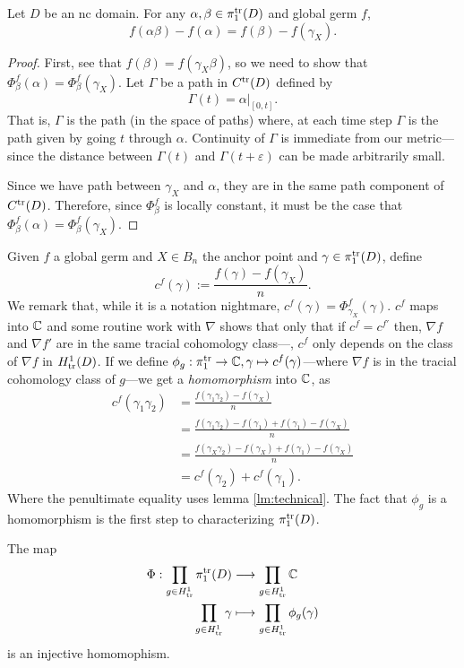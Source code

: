 \begin{lemma}%
\label{lm:technical}
  Let \(D\) be an nc domain. For any \(\alpha,\beta \in \pi_1^{\operatorname{tr}}(D)\) and
  global germ \(f\),
  \[
    f(\alpha\beta) - f(\alpha) = f(\beta) - f(\gamma_X).
  \]
\end{lemma}

\begin{proof}
  First, see that \(f(\beta)=f(\gamma_X\beta)\), so we need to show that
  \(\Phi_\beta^f(\alpha) = \Phi_\beta^f(\gamma_X)\). Let \(\Gamma\) be a path in
  \(C^{\operatorname{tr}}(D)\) defined by
  \[
    \Gamma(t) = \alpha\Big|_{[0,t]}.
  \]
  That is, \(\Gamma\) is the path (in the space of paths) where, at each time
  step \(\Gamma\) is the path given by going \(t\) through \(\alpha\).
  Continuity of \(\Gamma\) is immediate from our metric---since the distance
  between \(\Gamma(t)\) and \(\Gamma(t+\varepsilon)\) can be made arbitrarily
  small.

  Since we have path between \(\gamma_X\) and \(\alpha\), they are in the same
  path component of \(C^{\operatorname{tr}}(D)\). Therefore, since \(\Phi_\beta^f\) is locally
  constant, it must be the case that \(\Phi_\beta^f(\alpha) = \Phi_\beta^f(\gamma_X)\).
\end{proof}

Given \(f\) a global germ and \(X \in B_n\) the anchor point and
\(\gamma \in \pi_1^{\operatorname{tr}}(D)\), define
\[
  c^f(\gamma) := \frac{f(\gamma)-f(\gamma_X)}{n}.
\]
We remark that, while it is a notation nightmare,
\(c^f(\gamma) = \Phi^f_{\gamma_X}(\gamma)\). \(c^f\) maps into \(\mathbb{C} \) and some
routine work with \(\nabla\) shows that only that if \(c^f=c^{f'}\) then,
\(\nabla f\) and \(\nabla f'\) are in the same tracial
cohomology class---\ie, \(c^f\) only depends on the class of \(\nabla f \) in
\(H^1_{\operatorname{tr}}(D)\). If we define
\(\phi_g: \pi_1^{\operatorname{tr}}\to \mathbb{C} , \gamma \mapsto c^f(\gamma)\)---where \(\nabla f\)
is in the tracial cohomology class of \(g\)---we get a
\emph{homomorphism} into \(\mathbb{C} \), as
\begin{align*}
  c^f(\gamma_1\gamma_2) &= \frac{f(\gamma_1\gamma_2) - f(\gamma_X)}{n} \\
             &= \frac{f(\gamma_1\gamma_2) - f(\gamma_1) + f(\gamma_1) -f(\gamma_X)}{n} \\
             &= \frac{f(\gamma_X\gamma_2) - f(\gamma_X) + f(\gamma_1) -f(\gamma_X)}{n} \\
             &= c^f(\gamma_2) + c^f(\gamma_1).
\end{align*}
Where the penultimate equality uses lemma \ref{lm:technical}.
The fact that \(\phi_g\) is a homomorphism is the first step to characterizing
\(\pi_1^{\operatorname{tr}}(D)\).
\begin{lemma}
  The map
  \begin{align*}
	  \Phi: \prod_{g \in H^1_{\operatorname{tr}}} \pi_1^{\operatorname{tr}}(D) &\longrightarrow \prod_{g \in H^1_{\operatorname{tr}}}\mathbb{C}  \\
    \prod_{g \in H^1_{\operatorname{tr}}} \gamma &\longmapsto \prod_{g \in H^1_{\operatorname{tr}}} \phi_g(\gamma)
  \end{align*}
  is an injective homomophism.
\end{lemma}

